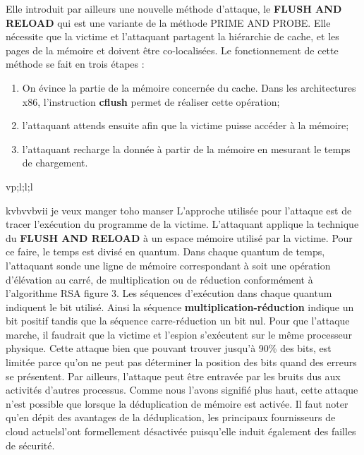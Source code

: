 Elle introduit  par ailleurs une nouvelle méthode d’attaque, le  \textbf{ FLUSH AND RELOAD} qui est une variante de la méthode PRIME AND PROBE.  Elle nécessite que la victime et l’attaquant partagent la hiérarchie de cache, et les pages de la mémoire et doivent être co-localisées. Le fonctionnement de  cette méthode se fait en trois étapes :
\begin{enumerate}
 \item On évince la partie de la mémoire concernée du cache. Dans les architectures x86, l’instruction \textbf{cflush} permet de réaliser cette opération;
 \item l’attaquant attends ensuite afin que la victime puisse accéder à la mémoire;
 \item l’attaquant recharge la donnée à partir de la mémoire  en mesurant le temps de chargement.
\end{enumerate} \newline{}
     vp;l;l;l    
\par
kvbvvbvii  je veux manger toho manser     
L’approche utilisée pour l’attaque est de tracer l’exécution du programme de la victime. L’attaquant applique la technique du \textbf{ FLUSH AND RELOAD} à un espace mémoire utilisé par la victime. Pour ce faire, le temps est divisé en quantum. Dans chaque quantum  de temps, l’attaquant sonde  une ligne de mémoire correspondant à soit une opération d’élévation au carré, de multiplication ou de réduction conformément à l’algorithme RSA figure 3. Les séquences d’exécution dans chaque quantum indiquent le bit utilisé. Ainsi la séquence \textbf{ multiplication-réduction} indique un bit positif tandis que la séquence {carre-réduction} un bit nul. Pour que l’attaque marche, il faudrait que la victime et l’espion s’exécutent sur le même processeur physique. Cette attaque bien que pouvant trouver jusqu’à 90\% des bits, est limitée parce qu’on ne peut pas déterminer la position des bits quand des erreurs se présentent. Par ailleurs, l’attaque peut être entravée par les bruits dus aux activités d’autres processus.
Comme nous l’avons signifié plus haut, cette attaque n’est possible que lorsque la déduplication de mémoire est activée. Il faut noter qu'en dépit des avantages de la déduplication, les principaux  fournisseurs de cloud actuelsl’ont formellement  désactivée puisqu’elle induit également des failles de sécurité. \newline{}


